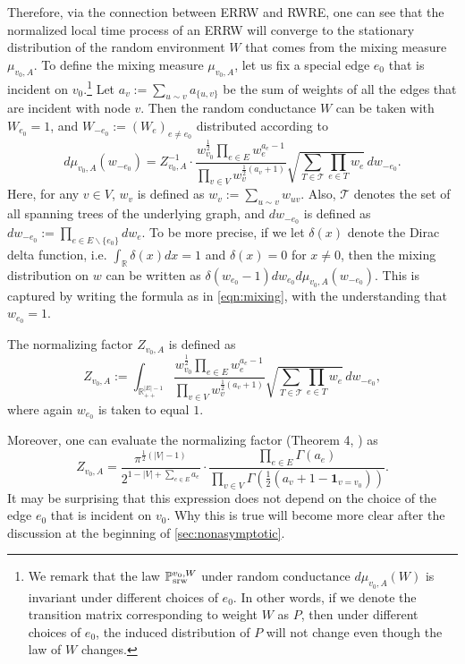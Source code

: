 \documentclass[a4paper, 11pt]{article}
\renewcommand{\P}{\mathbb{P}}
\newcommand{\Psrw}{\P_{\textnormal{srw}}}
\newcommand{\ind}{\mathbf{1}}
\begin{document}
Therefore, via the connection between ERRW and RWRE, one can see that the normalized local time process of an ERRW will converge to the stationary distribution of the random environment $W$ that comes from the mixing measure $\mu_{v_0, A}$. To define the mixing measure $\mu_{v_0,A}$, let us fix a special edge $e_0$ that is incident on $v_0$.\footnote{We remark that the law $\Psrw^{v_0,W}$ under random conductance $d\mu_{v_0,A}(W)$ is invariant under different choices of $e_0$. In other words, if we denote the transition matrix corresponding to weight $W$ as $P$, then under different choices of $e_0$, the induced distribution of $P$ will not change even though the law of $W$ changes.} Let 
$a_v:=\sum_{u\sim v}a_{\{u,v\}}$ be the sum of weights of all the edges that are incident with node $v$. Then the random conductance $W$ can be taken with $W_{e_0}=1$, and $W_{-e_0}:=(W_e)_{e\neq e_0}$ distributed according to
\begin{equation}
\label{eqn:mixing}
d\mu_{v_0,A}(w_{-e_0}) =Z_{v_0, A}^{-1}\cdot  
\frac{w_{v_0}^{\frac{1}{2}}\prod_{e\in E}w_e^{a_e-1}} {\prod_{v\in V}w_v^{\frac{1}{2}(a_v+1)}}
\sqrt{\sum_{T\in\mathcal{T}}\prod_{e\in T}w_e}\,dw_{-e_0}.
\end{equation}
Here, for any $v\in V$, $w_v$ is defined as $w_v:=\sum_{u\sim v}w_{uv}$.
Also, $\mathcal{T}$ denotes the set of all spanning trees of the underlying graph, and $dw_{-e_0}$ is defined as $dw_{-e_0}:=\prod_{e\in E\backslash\{e_0\}}dw_e$. 
To be more precise, if we let $\delta(x)$ denote the Dirac delta function, i.e. $\int_\mathbb{R}\delta(x)dx=1$ and $\delta(x) = 0$ for $x \neq 0$, then the mixing distribution on $w$ can be written as
$\delta(w_{e_0}-1)dw_{e_0}d\mu_{v_0,A}(w_{-e_0})$. 
This is captured by writing the formula as in 
\cref{eqn:mixing}, with the understanding that 
$w_{e_0} = 1$.

The normalizing factor $Z_{v_0, A}$ is defined as
\begin{equation}
\label{eqn:normalizer1}
Z_{v_0, A}:=\int_{\mathbb{R}_{++}^{|E|-1}} \frac{w_{v_0}^{\frac{1}{2}}\prod_{e\in E}w_e^{a_e-1}} {\prod_{v\in V}w_v^{\frac{1}{2}(a_v+1)}}
\sqrt{\sum_{T\in\mathcal{T}}\prod_{e\in T}w_e}\,dw_{-e_0},
\end{equation}
where again $w_{e_0}$ is taken to equal $1$.

Moreover, one can evaluate the normalizing factor (Theorem 4, \cite{stz}) as
\begin{equation}
\label{eqn:normalizer2}
Z_{v_0, A}=\frac{\pi^{\frac{1}{2}(|V|-1)}}{2^{1-|V|+\sum_{e\in E}a_e}}\cdot \frac{\prod_{e\in E}\Gamma(a_e)}{\prod_{v\in V}\Gamma(\frac{1}{2}(a_v+1-\ind_{v=v_0}))}.
\end{equation}
It may be surprising that this expression does not depend on the choice of the edge $e_0$ that is incident on $v_0$. Why this is true will become more clear after the discussion at the beginning of \cref{sec:nonasymptotic}.
\end{document}
